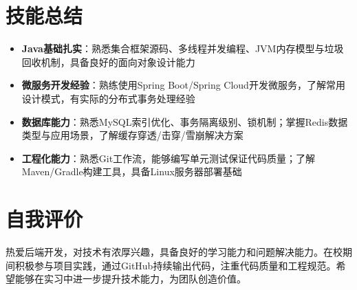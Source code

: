 \documentclass[11pt,a4paper]{article}
\begin{document}
\section{技能总结}
\begin{itemize}
    \item \textbf{Java基础扎实}：熟悉集合框架源码、多线程并发编程、JVM内存模型与垃圾回收机制，具备良好的面向对象设计能力
    \item \textbf{微服务开发经验}：熟练使用Spring Boot/Spring Cloud开发微服务，了解常用设计模式，有实际的分布式事务处理经验
    \item \textbf{数据库能力}：熟悉MySQL索引优化、事务隔离级别、锁机制；掌握Redis数据类型与应用场景，了解缓存穿透/击穿/雪崩解决方案
    \item \textbf{工程化能力}：熟悉Git工作流，能够编写单元测试保证代码质量；了解Maven/Gradle构建工具，具备Linux服务器部署基础
\end{itemize}
\vspace{0.2em}

\section{自我评价}
热爱后端开发，对技术有浓厚兴趣，具备良好的学习能力和问题解决能力。在校期间积极参与项目实践，通过GitHub持续输出代码，注重代码质量和工程规范。希望能够在实习中进一步提升技术能力，为团队创造价值。
\end{document}
